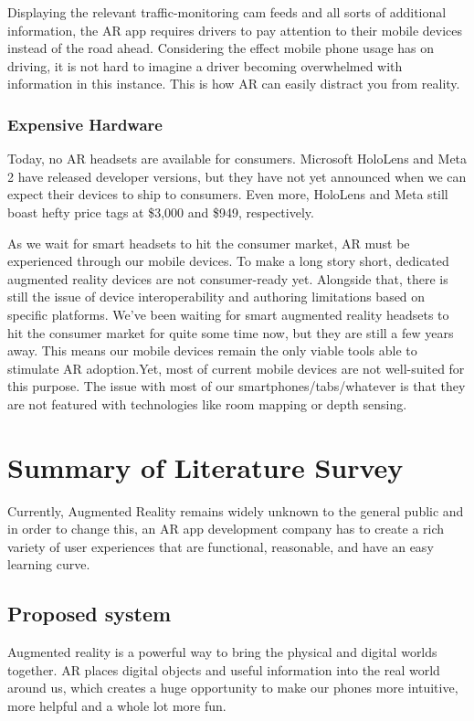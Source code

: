 \documentclass[BTech]{srmuthesis}
\begin{document}
Displaying the relevant traffic-monitoring cam feeds and all sorts of additional information, the AR app requires drivers to pay attention to their mobile devices instead of the road ahead. Considering the effect mobile phone usage has on driving, it is not hard to imagine a driver becoming overwhelmed with information in this instance. This is how AR can easily distract you from reality.
\subsubsection{Expensive Hardware}
Today, no AR headsets are available for consumers. Microsoft HoloLens and Meta 2 have released developer versions, but they have not yet announced when we can expect their devices to ship to consumers. Even more, HoloLens and Meta still boast hefty price tags at \$3,000 and \$949, respectively.

As we wait for smart headsets to hit the consumer market, AR must be experienced through our mobile devices. To make a long story short, dedicated augmented reality devices are not consumer-ready yet. Alongside that, there is still the issue of device interoperability and authoring limitations based on specific platforms. We’ve been waiting for smart augmented reality headsets to hit the consumer market for quite some time now, but they are still a few years away. This means our mobile devices remain the only viable tools able to stimulate AR adoption.Yet, most of current mobile devices are not well-suited for this purpose. The issue with most of our smartphones/tabs/whatever is that they are not featured with technologies like room mapping or depth sensing.

\section{Summary of Literature Survey}
Currently, Augmented Reality remains widely unknown to the general public and in order to change this, an AR app development company has to create a rich variety of user experiences that are functional, reasonable, and have an easy learning curve.
\subsection{Proposed system}
Augmented reality is a powerful way to bring the physical and digital worlds together. AR places digital objects and useful information into the real world around us, which creates a huge opportunity to make our phones more intuitive, more helpful and a whole lot more fun.
\end{document}
